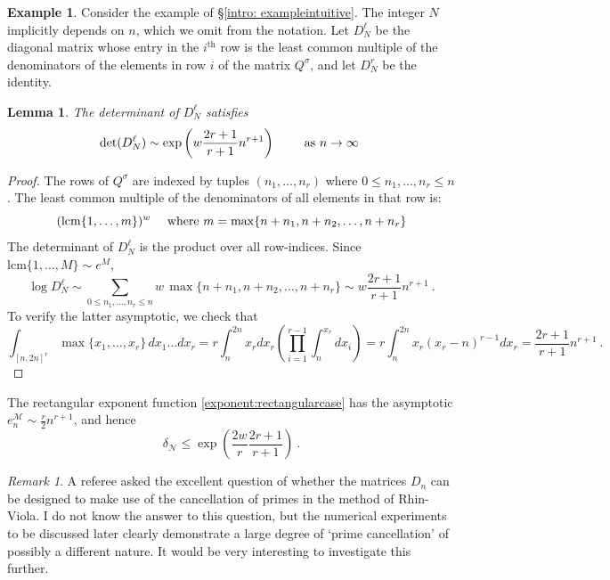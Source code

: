 \documentclass[a4paper,10pt]{amsart}
\newtheorem{lem}[thm]{Lemma}
\theoremstyle{definition}
\newtheorem{example}[thm]{Example}
\theoremstyle{remark}
\newtheorem{rem}[thm]{Remark}
\numberwithin{equation}{section}
\newcommand{\0}{\color{blue}{\mathsf{0}}}
\begin{document}
 
 
  \begin{example}
  Consider  the example of \S\ref{intro: exampleintuitive}.  The integer $N$ implicitly depends on $n$, which we omit from the notation. Let $D_N^{\ell}$ be the diagonal matrix whose entry  in the  $i^{\mathrm{th}}$ row is the least common multiple of the denominators of the elements in row $i$ of the matrix $Q^{\sigma}$, and let $D_N^r$ be the identity.
  
  
    \begin{lem} \label{lem: HardDenomBound} The determinant of $D^{\ell}_N$ satisfies
    \[\det(D^{\ell}_N) \sim \exp \left( w \frac{2r+1}{r+1} n^{r+1} \right)   \qquad \hbox{ as } n \rightarrow \infty\  \]
     \end{lem} 
     
     \begin{proof}
  The rows of $Q^{\sigma}$ are indexed by tuples $(n_1,\ldots, n_r)$ where $0\leq n_1,\ldots, n_r \leq n$. The least common multiple of the  denominators of all elements in that row is: 
  \[ (\mathrm{lcm} \{1,\ldots, m\})^w \quad \hbox{ where }  m = \max \{ n+n_1,n+n_2,\ldots, n+n_r\} \]
 The determinant of $D^{\ell}_N$ is the product over all row-indices. Since $\mathrm{lcm}\{1,\ldots, M\} \sim e^M$, 
 \[ \log D^{\ell}_N \sim \sum_{0\leq n_1,\ldots, n_r \leq n}   w\, \max \{ n+n_1,n+n_2,\ldots, n+n_r\} \sim  w  \frac{2r+1}{r+1} n^{r+1}\ . \]
  To verify the latter asymptotic, we check that
  \[ \int_{[n,2n]^r}  \max \{x_1,\ldots, x_r\} \, dx_1 \ldots dx_r =  r \int_{n}^{2n} x_r dx_r   \left(\prod_{i=1}^{r-1} \int_{n}^{x_r} dx_i \right)  =  r \int_{n}^{2n} x_r  (x_r-n)^{r-1} dx_r  
  =
     \frac{2r+1}{r+1} n^{r+1} \ . \]
  \end{proof}
 The rectangular exponent function \eqref{exponent:rectangularcase} has the asymptotic $e^{\mathcal{M}}_n \sim \frac{r}{2} n^{r+1}$, and hence 
  \begin{equation} \label{deltaboundforintroexample} \delta_{\mathcal{N}}  \leq  \exp \left( \frac{2w}{r} \frac{2r+1}{r+1}  \right) \  .\end{equation}
  \end{example}
 \begin{rem}
  A referee asked the excellent question of whether the matrices $D_n$ can be designed to make use of the cancellation of primes in the method of Rhin-Viola. I do not know the answer to this question, but the numerical experiments to be discussed later clearly demonstrate a large degree of `prime cancellation' of possibly a different nature. It would be very interesting to investigate this further. 
 \end{rem} 
 
\end{document}

